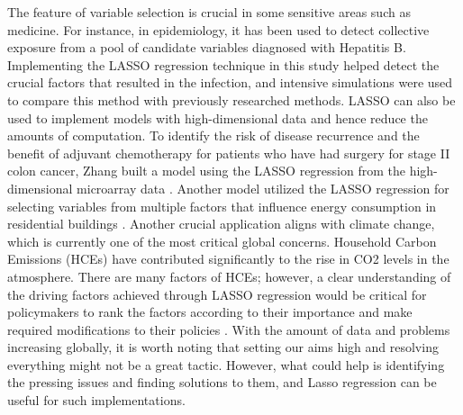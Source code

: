 The feature of variable selection is crucial in some sensitive areas such as medicine. For instance, in epidemiology, it has been used to detect collective exposure from a pool of candidate variables diagnosed with Hepatitis B. Implementing the LASSO regression technique in this study helped detect the crucial factors that resulted in the infection, and intensive simulations were used to compare this method with previously researched methods\cite{guo2015improved}. LASSO can also be used to implement models with high-dimensional data and hence reduce the amounts of computation. To identify the risk of disease recurrence and the benefit of adjuvant chemotherapy for patients who have had surgery for stage II colon cancer, Zhang built a model using the LASSO regression from the high-dimensional microarray data \cite{zhang2013prognostic}. Another model utilized the LASSO regression for selecting variables from multiple factors that influence energy consumption in residential buildings \cite{satre2019investigating}. Another crucial application aligns with climate change, which is currently one of the most critical global concerns. Household Carbon Emissions (HCEs) have contributed significantly to the rise in CO2 levels in the atmosphere. There are many factors of HCEs; however, a clear understanding of the driving factors achieved through LASSO regression would be critical for policymakers to rank the factors according to their importance and make required modifications to their policies \cite{shi2020prioritizing}. With the amount of data and problems increasing globally, it is worth noting that setting our aims high and resolving everything might not be a great tactic. However, what could help is identifying the pressing issues and finding solutions to them, and Lasso regression can be useful for such implementations.




